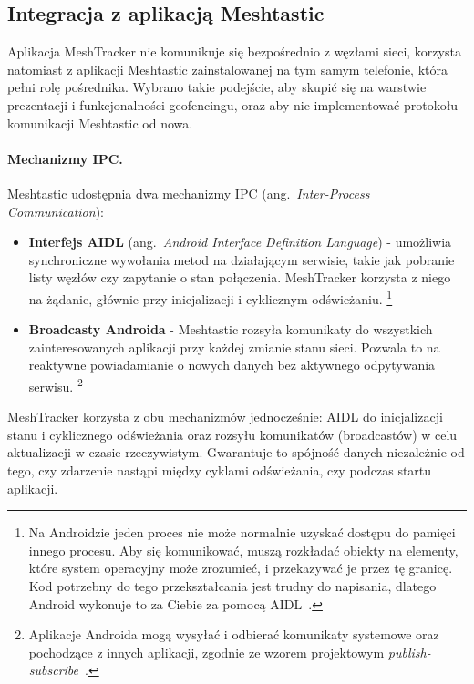 \subsection*{Integracja z aplikacją Meshtastic}
\label{sec:integracja-meshtastic}

Aplikacja MeshTracker nie komunikuje się bezpośrednio z węzłami sieci, korzysta natomiast
z aplikacji Meshtastic zainstalowanej na tym samym telefonie, która pełni rolę pośrednika. 
Wybrano takie podejście, aby skupić się na warstwie prezentacji i funkcjonalności geofencingu, 
oraz aby nie implementować protokołu komunikacji Meshtastic od nowa.

\paragraph{Mechanizmy IPC.}

Meshtastic udostępnia dwa mechanizmy IPC (ang.\ \textit{Inter-Process Communication}):

\begin{itemize}
    \item \textbf{Interfejs AIDL} (ang.\ \textit{Android Interface Definition Language}) -
          umożliwia synchroniczne wywołania metod na działającym serwisie, takie jak pobranie
          listy węzłów czy zapytanie o stan połączenia. MeshTracker korzysta z niego na żądanie,
          głównie przy inicjalizacji i cyklicznym odświeżaniu. \footnote{Na Androidzie jeden proces 
          nie może normalnie uzyskać dostępu do pamięci innego procesu. Aby się komunikować, muszą 
          rozkładać obiekty na elementy, które system operacyjny może zrozumieć, i przekazywać je 
          przez tę granicę. Kod potrzebny do tego przekształcania jest trudny do napisania, dlatego 
          Android wykonuje to za Ciebie za pomocą AIDL~\cite{androidAidlDocs}.}

    \item \textbf{Broadcasty Androida} - Meshtastic rozsyła komunikaty do wszystkich
          zainteresowanych aplikacji przy każdej zmianie stanu sieci. Pozwala to na reaktywne
          powiadamianie o nowych danych bez aktywnego odpytywania serwisu.  
        \footnote{Aplikacje Androida mogą wysyłać i odbierać komunikaty systemowe oraz pochodzące z innych aplikacji, zgodnie ze wzorem projektowym \textit{publish-subscribe}~\cite{androidBroadcastsDocs}.}
\end{itemize}

MeshTracker korzysta z obu mechanizmów jednocześnie: AIDL do inicjalizacji stanu i cyklicznego
odświeżania oraz rozsyłu komunikatów (broadcastów) w celu aktualizacji w czasie rzeczywistym. Gwarantuje to
spójność danych niezależnie od tego, czy zdarzenie nastąpi między cyklami odświeżania, czy
podczas startu aplikacji.

